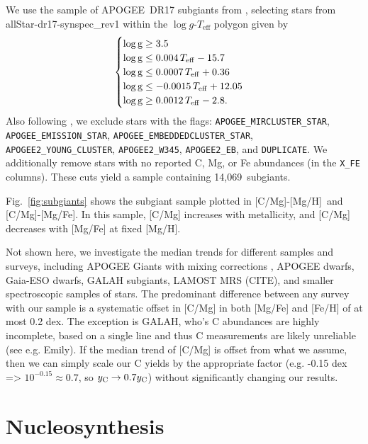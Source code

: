 \documentclass[fleqn,
usenatbib]{mnras}
\newcommand{\nsubgiants}{14,069}
\newcommand{\apogee}{APOGEE}
\newcommand{\caah}{[C/Mg]-[Mg/H]}
\newcommand{\caafe}{[C/Mg]-[Mg/Fe]}
\newcommand{\dbadd}[1]{{\color{Thistle} #1}}
\begin{document}
We use the sample of \apogee\ DR17 subgiants from \citet{jack}, selecting stars from allStar-dr17-synspec\_rev1 within the $\log g$-$T_\text{eff}$ polygon given by
 \begin{equation}
    \begin{cases} \label{eq:subgiant_selection}
        \log \text{g} \geq 3.5 \\
        \log \text{g} \leq 0.004\,T_{\rm eff} - 15.7 \\
        \log \text{g} \leq 0.0007\,T_{\rm eff} + 0.36 \\
        \log \text{g} \leq -0.0015\,T_{\rm eff} + 12.05 \\
        \log \text{g} \geq 0.0012\,T_{\rm eff} - 2.8. \\
    \end{cases}
\end{equation}
Also following \citet{jack}, we exclude stars with the flags:
        \verb|APOGEE_MIRCLUSTER_STAR|,
        \verb|APOGEE_EMISSION_STAR|,
        \verb|APOGEE_EMBEDDEDCLUSTER_STAR|,
        \verb|APOGEE2_YOUNG_CLUSTER|,
        \verb|APOGEE2_W345|,
        \verb|APOGEE2_EB|, and
        \verb|DUPLICATE|.
We additionally remove stars with no reported C, Mg, or Fe abundances (in the {\tt X\_FE} columns). These cuts yield a sample containing \nsubgiants\ subgiants.


Fig.~\ref{fig:subgiants} shows the subgiant sample plotted in \caah\ and \caafe{}.\footnotemark{} In this sample, [C/Mg] increases with metallicity, and [C/Mg] decreases with [Mg/Fe] at fixed [Mg/H]. 

\dbadd{
Not shown here, we investigate the median trends for different samples and surveys, including APOGEE Giants with mixing corrections \citep{vincenzo+21}, APOGEE dwarfs, Gaia-ESO dwarfs, GALAH subgiants, LAMOST MRS (CITE), and smaller spectroscopic samples of stars. The predominant difference between any survey with our sample is a systematic offset in [C/Mg] in both [Mg/Fe] and [Fe/H] of at most 0.2 dex. The exception is GALAH, who's C abundances are highly incomplete, based on a single line and thus C measurements are likely unreliable (see e.g. Emily). If the median trend of [C/Mg] is offset from what we assume, then we can simply scale our C yields by the appropriate factor (e.g. -0.15 dex => $10^{-0.15} \approx 0.7$, so $y_{\rm C} \rightarrow  0.7 y_{\rm C}$) without significantly changing our results.
}

\section{Nucleosynthesis}\label{sec:nucleosynthesis}
\end{document}
